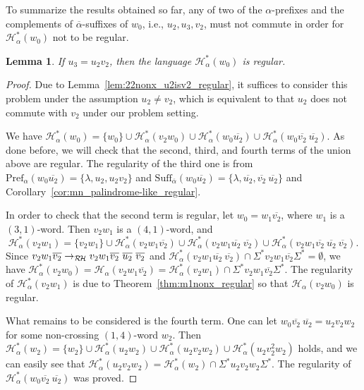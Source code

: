 \documentclass{article}
\theoremstyle{plain}
\newtheorem{lemma}{Lemma}
\theoremstyle{remark}
\newcommand{\RHC}{\ensuremath{\mathcal{R\hspace*{-0.5mm}H}}}
\newcommand{\HC}{\ensuremath{\mathcal{H}}}
\newcommand{\Pref}{\ensuremath{\mathrm{Pref}}}
\newcommand{\Suff}{\ensuremath{\mathrm{Suff}}}
\newcommand{\calpha}{\ensuremath{\overline{\alpha}}}
\begin{document}
To summarize the results obtained so far, any of two of the $\alpha$-prefixes and the complements of $\calpha$-suffixes of $w_0$, i.e., $u_2, u_3, v_2$, must not commute in order for $\HC_\alpha^*(w_0)$ not to be regular. 

\begin{lemma}
	If $u_3 = u_2 v_2$, then the language $\HC_\alpha^*(w_0)$ is regular. 
\end{lemma}
\begin{proof}
	Due to Lemma~\ref{lem:22nonx_u2isv2_regular}, it suffices to consider this problem under the assumption $u_2 \neq v_2$, which is equivalent to that $u_2$ does not commute with $v_2$ under our problem setting.  

	We have $\HC_\alpha^*(w_0) = \{w_0\} \cup \HC_\alpha^*(v_2 w_0) \cup \HC_\alpha^*(w_0 \overline{u_2}) \cup \HC_\alpha^*(w_0 \overline{v_2} \ \overline{u_2})$. 
	As done before, we will check that the second, third, and fourth terms of the union above are regular. 
	The regularity of the third one is from $\Pref_\alpha(w_0 \overline{u_2}) = \{\lambda, u_2, u_2 v_2\}$ and $\Suff_{\calpha}(w_0 \overline{u_2}) = \{\lambda, \overline{u_2}, \overline{v_2} \ \overline{u_2}\}$ and Corollary~\ref{cor:mn_palindrome-like_regular}. 

	In order to check that the second term is regular, let $w_0 = w_1 \overline{v_2}$, where $w_1$ is a $(3,1)$-word. 
	Then $v_2w_1$ is a $(4, 1)$-word, and 
	\[
		\HC_\alpha^*(v_2 w_1) = \{v_2 w_1\} \cup \HC_\alpha^*(v_2w_1 \overline{v_2}) \cup \HC_\alpha^*(v_2 w_1 \overline{u_2} \ \overline{v_2}) \cup \HC_\alpha^*(v_2 w_1 \overline{v_2} \ \overline{u_2} \ \overline{v_2}). 
	\]
	Since $v_2 w_1 \overline{v_2} \to_{\RHC} v_2 w_1 \overline{v_2} \ \overline{u_2} \ \overline{v_2}$ and $\HC_\alpha^*(v_2 w_1 \overline{u_2} \ \overline{v_2}) \cap \Sigma^* v_2 w_1 \overline{v_2} \Sigma^* = \emptyset$, we have $\HC_\alpha^*(v_2 w_0) = \HC_\alpha(v_2 w_1 \overline{v_2}) = \HC_\alpha^*(v_2 w_1) \cap \Sigma^* v_2 w_1 \overline{v_2} \Sigma^*$. 
	The regularity of $\HC_\alpha^*(v_2 w_1)$ is due to Theorem~\ref{thm:m1nonx_regular} so that $\HC_\alpha(v_2 w_0)$ is regular. 

	What remains to be considered is the fourth term. 
	One can let $w_0 \overline{v_2} \ \overline{u_2} = u_2 v_2 w_2$ for some non-crossing $(1, 4)$-word $w_2$. 
	Then $\HC_\alpha^*(w_2) = \{w_2\} \cup \HC_\alpha^*(u_2 w_2) \cup \HC_\alpha^*(u_2 v_2 w_2) \cup \HC_\alpha^*(u_2 v_2^2 w_2)$ holds, and we can easily see that $\HC_\alpha^*(u_2v_2w_2) = \HC_\alpha^*(w_2) \cap \Sigma^* u_2 v_2 w_2 \Sigma^*$. 
	The regularity of $\HC_\alpha^*(w_0 \overline{v_2} \ \overline{u_2})$ was proved. 
\end{proof}
\end{document}
